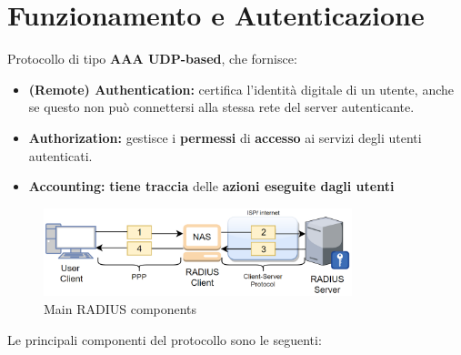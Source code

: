 \section{Funzionamento e Autenticazione}
\begin{definition}
Protocollo di tipo \textbf{AAA UDP-based}\footnotemark, che fornisce: 
\begin{itemize}
    \item \textbf{(Remote) Authentication:} certifica l'identità digitale di un utente, anche se questo non può connettersi alla stessa rete del server autenticante.
    \item \textbf{Authorization:} gestisce i \textbf{permessi} di \textbf{accesso} ai servizi degli utenti autenticati.\footnotemark
    \item \textbf{Accounting:} \textbf{tiene traccia} delle \textbf{azioni eseguite dagli utenti}\footnotemark
\end{itemize}
\end{definition}
\begin{figure}[h]
    \centering
    \includegraphics[width=0.8\textwidth]{image/radius.png}
    \caption{Main RADIUS components}
    \label{fig:radiusscheme}
\end{figure}\pagebreak
Le principali componenti del protocollo sono le seguenti:
